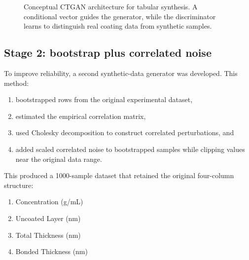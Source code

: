 \documentclass[11pt]{article}
\begin{document}
\begin{figure}[H]
\centering
{}
\caption{Conceptual CTGAN architecture for tabular synthesis. A conditional vector guides the generator, while the discriminator learns to distinguish real coating data from synthetic samples.}
\end{figure}

\subsection{Stage 2: bootstrap plus correlated noise}
To improve reliability, a second synthetic-data generator was developed. This method:
\begin{enumerate}
    \item bootstrapped rows from the original experimental dataset,
    \item estimated the empirical correlation matrix,
    \item used Cholesky decomposition to construct correlated perturbations, and
    \item added scaled correlated noise to bootstrapped samples while clipping values near the original data range.
\end{enumerate}

This produced a 1000-sample dataset that retained the original four-column structure:
\begin{enumerate}
    \item Concentration (g/mL)
    \item Uncoated Layer (nm)
    \item Total Thickness (nm)
    \item Bonded Thickness (nm)
\end{enumerate}
\end{document}
